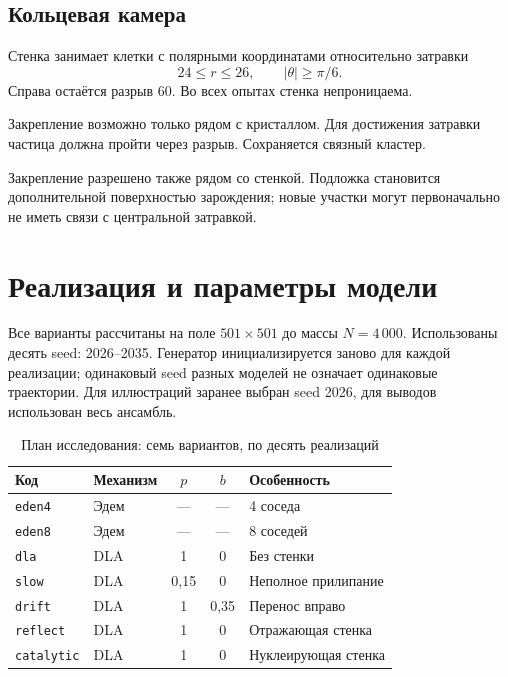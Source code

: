 \documentclass[12pt,a4paper]{article}
\begin{document}
\subsection{Кольцевая камера}
Стенка занимает клетки с полярными координатами относительно затравки
\[
 24\leq r\leq26,\qquad |\theta|\geq\pi/6.
\]
Справа остаётся разрыв 60\textdegree. Во всех опытах стенка непроницаема.
\begin{description}[leftmargin=0pt]
\item[Отражение.] Закрепление возможно только рядом с кристаллом. Для достижения
затравки частица должна пройти через разрыв. Сохраняется связный кластер.
\item[Нуклеация.] Закрепление разрешено также рядом со стенкой. Подложка становится
дополнительной поверхностью зарождения; новые участки могут первоначально
не иметь связи с центральной затравкой.
\end{description}

\section{Реализация и параметры модели}
Все варианты рассчитаны на поле $501\times501$ до массы $N=4\,000$.
Использованы десять seed: 2026--2035. Генератор инициализируется заново для
каждой реализации; одинаковый seed разных моделей не означает одинаковые траектории.
Для иллюстраций заранее выбран seed 2026, для выводов использован весь ансамбль.

\begin{table}[htbp]
\centering\small
\caption{План исследования: семь вариантов, по десять реализаций}
\begin{tabularx}{\textwidth}{@{}lYccY@{}}
\toprule
Код & Механизм & $p$ & $b$ & Особенность\\
\midrule
\texttt{eden4} & Эдем & --- & --- & 4 соседа\\
\texttt{eden8} & Эдем & --- & --- & 8 соседей\\
\texttt{dla} & DLA & 1 & 0 & Без стенки\\
\texttt{slow} & DLA & 0,15 & 0 & Неполное прилипание\\
\texttt{drift} & DLA & 1 & 0,35 & Перенос вправо\\
\texttt{reflect} & DLA & 1 & 0 & Отражающая стенка\\
\texttt{catalytic} & DLA & 1 & 0 & Нуклеирующая стенка\\
\bottomrule
\end{tabularx}
\end{table}
\end{document}
